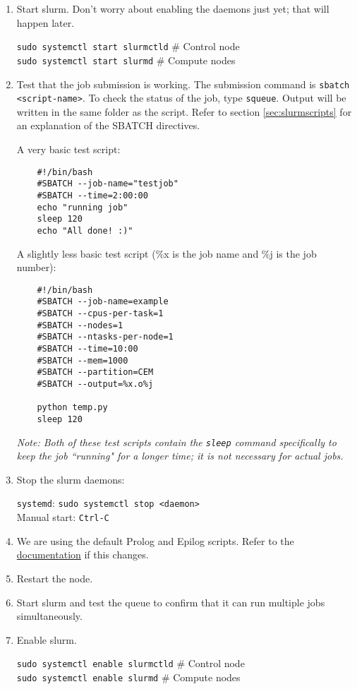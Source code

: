 \begin{enumerate}
\item Start slurm. Don't worry about enabling the daemons just yet; that will happen later.

	\texttt{sudo systemctl start slurmctld} \# Control node \\
	\texttt{sudo systemctl start slurmd} \# Compute nodes 

\item Test that the job submission is working. The submission command is \texttt{sbatch <script-name>}. To check the status of the job, type \texttt{squeue}. Output will be written in the same folder as the script. Refer to section \ref{sec:slurmscripts} for an explanation of the SBATCH directives.

A very basic test script:
\begin{verbatim}
	#!/bin/bash
	#SBATCH --job-name="testjob"
	#SBATCH --time=2:00:00
	echo "running job"
	sleep 120
	echo "All done! :)"
\end{verbatim}

A slightly less basic test script (\%x is the job name and \%j is the job number):
\begin{verbatim}
	#!/bin/bash
	#SBATCH --job-name=example
	#SBATCH --cpus-per-task=1
	#SBATCH --nodes=1
	#SBATCH --ntasks-per-node=1
	#SBATCH --time=10:00
	#SBATCH --mem=1000
	#SBATCH --partition=CEM
	#SBATCH --output=%x.o%j

	python temp.py
	sleep 120
\end{verbatim}

\emph{Note: Both of these test scripts contain the \emph{\texttt{sleep}} command specifically to keep the job ``running" for a longer time; it is not necessary for actual jobs.}

\item Stop the slurm daemons: 

	\texttt{systemd}: \texttt{sudo systemctl stop <daemon>} \\
	Manual start: \texttt{Ctrl-C}

\item We are using the default Prolog and Epilog scripts. Refer to the \href{https://slurm.schedmd.com/slurm.conf.html}{documentation} if this changes.

\item Restart the node.
	
\item Start slurm and test the queue to confirm that it can run multiple jobs simultaneously.

\item Enable slurm.

	\texttt{sudo systemctl enable slurmctld} \quad \# Control node \\
	\texttt{sudo systemctl enable slurmd} \quad \# Compute nodes 
	
\end{enumerate}

